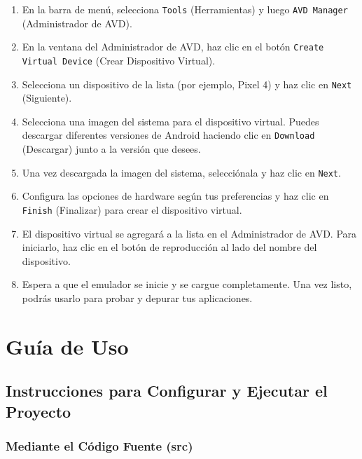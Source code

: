 \documentclass{article}
\begin{document}
\begin{itemize}
            \begin{enumerate}
                \item En la barra de menú, selecciona \texttt{Tools} (Herramientas) y luego \texttt{AVD Manager} (Administrador de AVD).
                \item En la ventana del Administrador de AVD, haz clic en el botón \texttt{Create Virtual Device} (Crear Dispositivo Virtual).
                \item Selecciona un dispositivo de la lista (por ejemplo, Pixel 4) y haz clic en \texttt{Next} (Siguiente).
                \item Selecciona una imagen del sistema para el dispositivo virtual. Puedes descargar diferentes versiones de Android haciendo clic en \texttt{Download} (Descargar) junto a la versión que desees.
                \item Una vez descargada la imagen del sistema, selecciónala y haz clic en \texttt{Next}.
                \item Configura las opciones de hardware según tus preferencias y haz clic en \texttt{Finish} (Finalizar) para crear el dispositivo virtual.
                \item El dispositivo virtual se agregará a la lista en el Administrador de AVD. Para iniciarlo, haz clic en el botón de reproducción al lado del nombre del dispositivo.
                \item Espera a que el emulador se inicie y se cargue completamente. Una vez listo, podrás usarlo para probar y depurar tus aplicaciones.
            \end{enumerate}

    \end{itemize}

\section{Guía de Uso}
    \subsection{Instrucciones para Configurar y Ejecutar el Proyecto}

    \subsubsection{Mediante el Código Fuente (src)}
\end{document}
